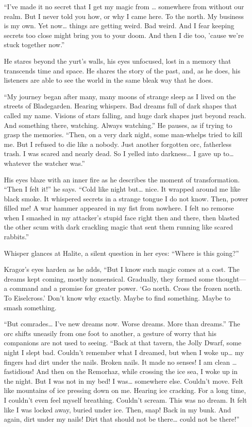 \documentclass[
  letterpaper,12pt,twoside,twocolumn,openany,
  nodeprecatedcode,bg=full]{dndbook}
\begin{document}
``I've made it no secret that I get my magic from \ldots{} somewhere
from without our realm. But I never told you how, or why I came here. To
the north. My business is my own. Yet now\ldots{} things are getting
weird. Bad weird. And I fear keeping secrets too close might bring you
to your doom. And then I die too, 'cause we're stuck together now.''

He stares beyond the yurt's walls, his eyes unfocused, lost in a memory
that transcends time and space. He shares the story of the past, and, as
he does, his listeners are able to see the world in the same bleak way
that he does.

``My journey began after many, many moons of strange sleep as I lived on
the streets of Bladegarden. Hearing whispers. Bad dreams full of dark
shapes that called my name. Visions of stars falling, and huge dark
shapes just beyond reach. And something there, watching. Always
watching.'' He pauses, as if trying to grasp the memories. ``Then, on a
very dark night, some man-whelps tried to kill me. But I refused to die
like a nobody. Just another forgotten orc, fatherless trash. I was
scared and nearly dead. So I yelled into darkness\ldots{} I gave up
to\ldots{} whatever the watcher was.''

His eyes blaze with an inner fire as he describes the moment of
transformation. ``Then I felt it!'' he says. ``Cold like night
but\ldots{} nice. It wrapped around me like black smoke. It whispered
secrets in a strange tongue I do not know. Then, power filled me! A war
hammer appeared in my fist from nowhere. I felt no remorse when I
smashed in my attacker's stupid face right then and there, then blasted
the other scum with dark crackling magic that sent them running like
scared rabbits.''

Whisper glances at Halite, a silent question in her eyes: ``Where is
this going?''

Kragor's eyes harden as he adds, ``But I know such magic comes at a
cost. The dreams kept coming, mostly nonsensical. Gradually, they formed
some thought--- a command and a promise for greater power. `Go north.
Cross the frozen north. To Eiselcross.' Don't know why exactly. Maybe to
find something. Maybe to smash something.

``But comrades\ldots{} I've new dreams now. Worse dreams. More than
dreams.'' The orc shifts uneasily from one foot to another, a gesture of
worry that his companions are not used to seeing. ``Back at that tavern,
the Jolly Dwarf, some night I slept bad. Couldn't remember what I
dreamed, but when I woke up\ldots{} my fingers had dirt under the nails.
Broken nails. It made no senses! I am clean \ldots{} fastidious! And
then on the Remorhaz, while crossing the ice sea, I woke up in the
night. But I was not in my bed! I was\ldots{} somewhere else. Couldn't
move. Felt like mountains of ice pressing down on me. Hearing ice
cracking. For a long time, I couldn't even feel myself breathing.
Couldn't scream. This was no dream. It felt like I was locked away,
buried under ice. Then, snap! Back in my bunk. And again, dirt under my
nails! Dirt that should not be there\ldots{} could not be there!''
\end{document}
